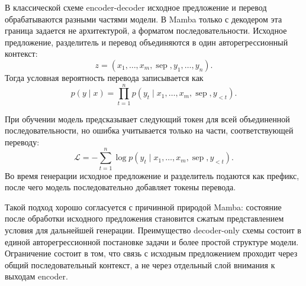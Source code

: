 В классической схеме encoder-decoder исходное предложение и перевод обрабатываются разными частями модели.
В Mamba только с декодером эта граница задается не архитектурой, а форматом последовательности.
Исходное предложение, разделитель и перевод объединяются в один авторегрессионный контекст:
\begin{equation}
    z = (x_1, \ldots, x_m, \operatorname{sep}, y_1, \ldots, y_n).
\end{equation}
Тогда условная вероятность перевода записывается как
\begin{equation}
    p(y \mid x) = \prod_{t=1}^{n}
    p(y_t \mid x_1, \ldots, x_m, \operatorname{sep}, y_{<t}).
\end{equation}

При обучении модель предсказывает следующий токен для всей объединенной последовательности, но ошибка учитывается только на части, соответствующей переводу:
\begin{equation}
    \mathcal{L} = - \sum_{t=1}^{n}
    \log p(y_t \mid x_1, \ldots, x_m, \operatorname{sep}, y_{<t}).
\end{equation}
Во время генерации исходное предложение и разделитель подаются как префикс, после чего модель последовательно добавляет токены перевода.

Такой подход хорошо согласуется с причинной природой Mamba: состояние после обработки исходного предложения становится сжатым представлением условия для дальнейшей генерации.
Преимущество decoder-only схемы состоит в единой авторегрессионной постановке задачи и более простой структуре модели.
Ограничение состоит в том, что связь с исходным предложением проходит через общий последовательный контекст, а не через отдельный слой внимания к выходам encoder.
